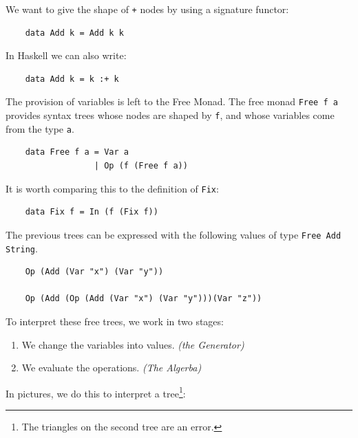 \documentclass[a4paper,12pt]{article}
\theoremstyle{remark}
\begin{document}
We want to give the shape of \lstinline{+} nodes by using a signature functor:

\begin{lstlisting}
    data Add k = Add k k  \end{lstlisting}

In Haskell we can also write:

\begin{lstlisting}
    data Add k = k :+ k  \end{lstlisting}

The provision of variables is left to the Free Monad. The free monad \lstinline{Free f a} provides syntax
trees whose nodes are shaped by \lstinline{f}, and whose variables come from the type \lstinline{a}.

\begin{lstlisting}
    data Free f a = Var a
                  | Op (f (Free f a))  \end{lstlisting}

It is worth comparing this to the definition of \lstinline{Fix}:

\begin{lstlisting}
    data Fix f = In (f (Fix f))  \end{lstlisting}

The previous trees can be expressed with the following values of type \lstinline{Free Add String}.

\begin{lstlisting}
    Op (Add (Var "x") (Var "y"))

    Op (Add (Op (Add (Var "x") (Var "y")))(Var "z"))  \end{lstlisting}

To interpret these free trees, we work in two stages:

\begin{enumerate}
  \item We change the variables into values. \textit{(the Generator)}
  \item We evaluate the operations. \textit{(The Algerba)}
\end{enumerate}

In pictures, we do this to interpret a tree\footnote{The triangles on the second tree are an error.}:

\begin{figure}[H]
  \centering
\end{figure}
\end{document}

